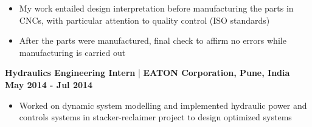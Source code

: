 \documentclass[10pt,a4paper]{extarticle}
\begin{document}
\vspace{-0.5em}
\begin{itemize}[leftmargin = 0.6cm]
\setlength\itemsep{-0.2em}
\item My work entailed design interpretation before manufacturing the parts in CNCs, with particular attention to quality control (ISO standards)
\item After the parts were manufactured, final check to affirm no errors while manufacturing is carried out
\end{itemize}
\fi
\textbf{Hydraulics Engineering Intern} | \textbf{EATON Corporation, Pune, India} \hfill\textbf{May 2014 - Jul 2014}
\vspace{-0.5em}
\begin{itemize}[leftmargin = 0.6cm]
\setlength\itemsep{-0.2em}
\item Worked on dynamic system modelling and implemented hydraulic power and controls systems in stacker-reclaimer project to design optimized systems
\end{itemize}

\vspace{-0.2cm}
\end{document}
